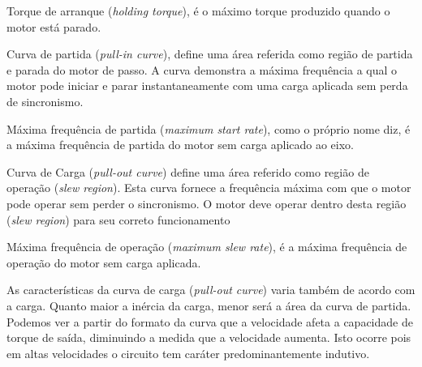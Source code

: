 Torque de arranque (\textit{holding torque}), é o máximo torque produzido quando o motor está parado.

Curva de partida (\textit{pull-in curve}), define uma área referida como região de partida e parada do motor de passo. A curva demonstra a máxima frequência a qual o motor pode iniciar e parar instantaneamente com uma carga aplicada sem perda de sincronismo.

Máxima frequência de partida (\textit{maximum start rate}), como o próprio nome diz, é a máxima frequência de partida do motor sem carga aplicado ao eixo.

Curva de Carga (\textit{pull-out curve}) define uma área referido como região de operação (\textit{slew region}). Esta curva fornece a frequência máxima com que o motor pode operar sem perder o sincronismo. O motor deve operar dentro desta região (\textit{slew region}) para seu correto funcionamento 

Máxima frequência de operação (\textit{maximum slew rate}), é a máxima frequência de operação do motor sem carga aplicada.

As características da curva de carga (\textit{pull-out curve}) varia também de acordo com a carga. Quanto maior a inércia da carga, menor será a área da curva de partida. Podemos ver a partir do formato da curva que a velocidade afeta a capacidade de torque de saída, diminuindo a medida que a velocidade aumenta. Isto ocorre pois em altas velocidades o circuito tem caráter predominantemente indutivo.


